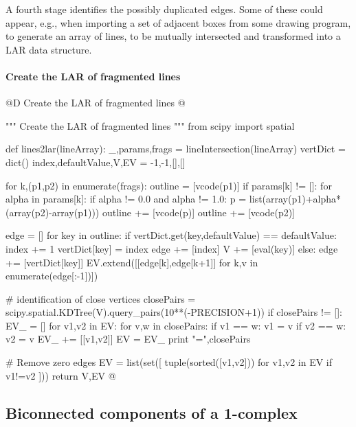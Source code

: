 \documentclass[11pt,oneside]{article}    %
\begin{document}
A fourth stage identifies the possibly duplicated edges. Some of these could appear, e.g., when importing a set of adjacent boxes from some drawing program, to generate an array of lines, to be mutually intersected and transformed into a LAR data structure.

\paragraph{Create the LAR of fragmented lines}
@D Create the LAR of fragmented lines
@{""" Create the LAR of fragmented lines """
from scipy import spatial

def lines2lar(lineArray):
    _,params,frags = lineIntersection(lineArray)
    vertDict = dict()
    index,defaultValue,V,EV = -1,-1,[],[]
    
    for k,(p1,p2) in enumerate(frags):
        outline = [vcode(p1)]
        if params[k] != []:
            for alpha in params[k]:
                if alpha != 0.0 and alpha != 1.0:
                    p = list(array(p1)+alpha*(array(p2)-array(p1)))
                    outline += [vcode(p)]
        outline += [vcode(p2)]
    
        edge = []
        for key in outline:
            if vertDict.get(key,defaultValue) == defaultValue:
                index += 1
                vertDict[key] = index
                edge += [index]
                V += [eval(key)]
            else:
                edge += [vertDict[key]]
            EV.extend([[edge[k],edge[k+1]] for k,v in enumerate(edge[:-1])])
    
    # identification of close vertices
    closePairs = scipy.spatial.KDTree(V).query_pairs(10**(-PRECISION+1))
    if closePairs != []:
        EV_ = []
        for v1,v2 in EV:
            for v,w in closePairs:
                if v1 == w: v1 = v
                if v2 == w: v2 = v
            EV_ += [[v1,v2]]
        EV = EV_
        print "\nclosePairs =",closePairs

    # Remove zero edges
    EV = list(set([ tuple(sorted([v1,v2])) for v1,v2 in EV if v1!=v2 ]))
    return V,EV
@}

\subsection{Biconnected components of a 1-complex}
\end{document}
